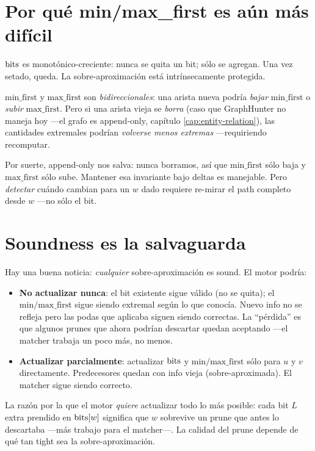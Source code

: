 \section{Por qué min/max\_first es aún más difícil}

\(\mathrm{bits}\) es monotónico-creciente: nunca se quita un bit; sólo
se agregan. Una vez setado, queda. La sobre-aproximación está
intrínsecamente protegida.

\(\mathrm{min\_first}\) y \(\mathrm{max\_first}\) son
\emph{bidireccionales}: una arista nueva podría \emph{bajar}
\(\mathrm{min\_first}\) o \emph{subir} \(\mathrm{max\_first}\). Pero
si una arista vieja se \emph{borra} (caso que GraphHunter no
maneja hoy ---el grafo es append-only, capítulo
\ref{cap:entity-relation}), las cantidades extremales podrían
\emph{volverse menos extremas} ---requiriendo recomputar.

Por suerte, append-only nos salva: nunca borramos, así que
\(\mathrm{min\_first}\) sólo baja y \(\mathrm{max\_first}\) sólo
sube. Mantener esa invariante bajo deltas es manejable. Pero
\emph{detectar} cuándo cambian para un \(w\) dado requiere
re-mirar el path completo desde \(w\) ---no sólo el bit.

\section{Soundness es la salvaguarda}

Hay una buena noticia: \emph{cualquier} sobre-aproximación es
sound. El motor podría:

\begin{itemize}
    \item \textbf{No actualizar nunca}: el bit existente sigue
    válido (no se quita); el \(\mathrm{min/max\_first}\) sigue
    siendo extremal según lo que conocía. Nuevo info no se refleja
    pero las podas que aplicaba siguen siendo correctas. La
    ``pérdida'' es que algunos prunes que ahora podrían descartar
    quedan aceptando ---el matcher trabaja un poco más, no menos.
    \item \textbf{Actualizar parcialmente}: actualizar \(\mathrm{bits}\) y
    \(\mathrm{min/max\_first}\) sólo para \(u\) y \(v\)
    directamente. Predecesores quedan con info vieja
    (sobre-aproximada). El matcher sigue siendo correcto.
\end{itemize}

\noindent
La razón por la que el motor \emph{quiere} actualizar todo lo más
posible: cada bit \(L\) extra prendido en \(\mathrm{bits}[w]\) significa
que \(w\) sobrevive un prune que antes lo descartaba ---más
trabajo para el matcher---. La calidad del prune depende de qué
tan tight sea la sobre-aproximación.

